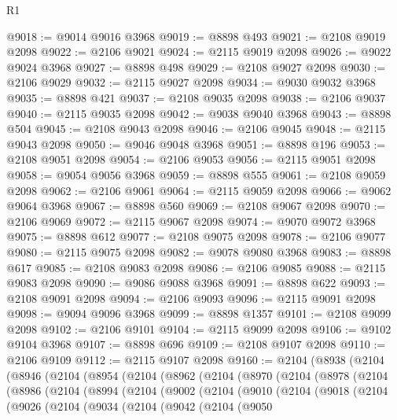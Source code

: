 \begin{lexlean}{R1}
\begin{coremodule}
@9018 := @9014 @9016 @3968
@9019 := @8898 @493
@9021 := @2108 @9019 @2098
@9022 := @2106 @9021
@9024 := @2115 @9019 @2098
@9026 := @9022 @9024 @3968
@9027 := @8898 @498
@9029 := @2108 @9027 @2098
@9030 := @2106 @9029
@9032 := @2115 @9027 @2098
@9034 := @9030 @9032 @3968
@9035 := @8898 @421
@9037 := @2108 @9035 @2098
@9038 := @2106 @9037
@9040 := @2115 @9035 @2098
@9042 := @9038 @9040 @3968
@9043 := @8898 @504
@9045 := @2108 @9043 @2098
@9046 := @2106 @9045
@9048 := @2115 @9043 @2098
@9050 := @9046 @9048 @3968
@9051 := @8898 @196
@9053 := @2108 @9051 @2098
@9054 := @2106 @9053
@9056 := @2115 @9051 @2098
@9058 := @9054 @9056 @3968
@9059 := @8898 @555
@9061 := @2108 @9059 @2098
@9062 := @2106 @9061
@9064 := @2115 @9059 @2098
@9066 := @9062 @9064 @3968
@9067 := @8898 @560
@9069 := @2108 @9067 @2098
@9070 := @2106 @9069
@9072 := @2115 @9067 @2098
@9074 := @9070 @9072 @3968
@9075 := @8898 @612
@9077 := @2108 @9075 @2098
@9078 := @2106 @9077
@9080 := @2115 @9075 @2098
@9082 := @9078 @9080 @3968
@9083 := @8898 @617
@9085 := @2108 @9083 @2098
@9086 := @2106 @9085
@9088 := @2115 @9083 @2098
@9090 := @9086 @9088 @3968
@9091 := @8898 @622
@9093 := @2108 @9091 @2098
@9094 := @2106 @9093
@9096 := @2115 @9091 @2098
@9098 := @9094 @9096 @3968
@9099 := @8898 @1357
@9101 := @2108 @9099 @2098
@9102 := @2106 @9101
@9104 := @2115 @9099 @2098
@9106 := @9102 @9104 @3968
@9107 := @8898 @696
@9109 := @2108 @9107 @2098
@9110 := @2106 @9109
@9112 := @2115 @9107 @2098
@9160 := @2104
    (@8938
      (@2104
        (@8946
          (@2104
            (@8954
              (@2104
                (@8962
                  (@2104
                    (@8970
                      (@2104
                        (@8978
                          (@2104
                            (@8986
                              (@2104
                                (@8994
                                  (@2104
                                    (@9002
                                      (@2104
                                        (@9010
                                          (@2104
                                            (@9018
                                              (@2104
                                                (@9026
                                                  (@2104
                                                    (@9034
                                                      (@2104
                                                        (@9042
                                                          (@2104
                                                            (@9050

\end{coremodule}
\end{lexlean}
